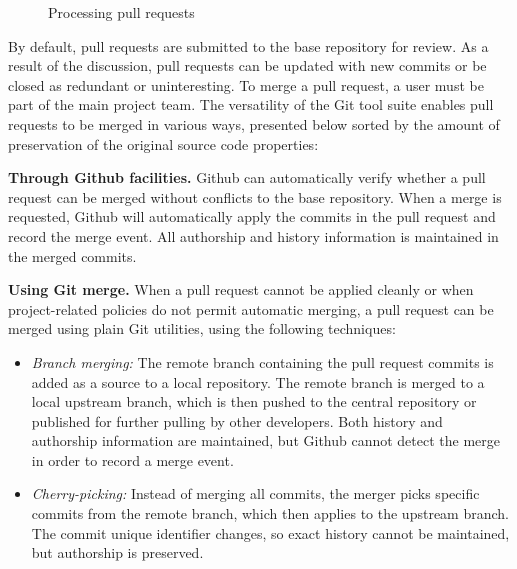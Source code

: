 \documentclass{acm_proc_article-sp}
\begin{document}
\begin{figure}[t]
  \centering
{}
\caption{Processing pull requests}
\end{figure}

By default, pull requests are submitted to the base repository for review.
As a result of the discussion, pull requests can be updated with new commits or
be closed as redundant or uninteresting. To merge a pull request, a user must
be part of the main project team. The versatility of the Git tool suite enables
pull requests to be merged in various ways, presented below sorted by
the amount of preservation of the original source code properties:

\textbf{Through Github facilities.}
    Github can automatically verify whether a
    pull request can be merged without conflicts to the base repository. When a
    merge is requested, Github will automatically apply the commits in the pull
    request and record the merge event. All authorship and history information
    is maintained in the merged commits.

    \textbf{Using Git merge.} When a pull request cannot be applied cleanly or when
    project-related policies do not permit automatic merging, a pull request
    can be merged using plain Git utilities, using the following
    techniques: 

    \begin{itemize}

      \item \emph{Branch merging:} The remote branch containing the pull
        request commits is added as a source to a local repository. The remote 
        branch is merged to a local upstream branch, which is then pushed to
        the central repository or published for further pulling by other
        developers. Both history and authorship information are maintained,
        but Github cannot detect the merge in order to record a merge event. 

      \item \emph{Cherry-picking:} Instead of merging all commits, the merger
        picks specific commits from the remote branch, which then applies to the
        upstream branch. The commit unique identifier changes, so exact history
        cannot be maintained, but authorship is preserved.
    
    \end{itemize}
\end{document}
